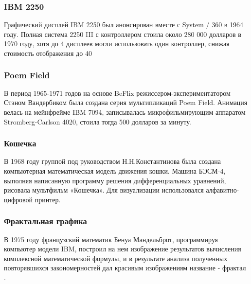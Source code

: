 \documentclass[10pt]{beamer}
\begin{document}
\begin{frame}\frametitle {IBM 2250}
{
	{
	}
	{
		Графический дисплей IBM 2250 был анонсирован вместе с System / 360 в 1964 году. Полная система 2250 III с контроллером стоила около 280 000 долларов в 1970 году, хотя до 4 дисплеев могли использовать один контроллер, снижая стоимость отображения до 40
	}
	
}\end{frame}


\begin{frame}\frametitle {Poem Field}
{
	{
	}
	{
		В период 1965-1971 годов на основе BeFlix режиссером-экспериментатором Стэном Вандербиком была создана серия мультипликаций Poem Field. Анимация велась на мейнфрейме IBM 7094, записывалась микрофильмирующим аппаратом Stromberg-Carlson 4020, стоила тогда 500 долларов за минуту.
		
		\hfill
		
	}
}\end{frame}

\begin{frame}\frametitle{Кошечка}{
	{
		В 1968 году группой под руководством Н.Н.Константинова была создана компьютерная математическая модель движения кошки. Машина БЭСМ-4, выполняя написанную программу решения дифференциальных уравнений, рисовала мультфильм «Кошечка». Для визуализации использовался алфавитно-цифровой принтер.
		

	}
	{
		
		\hfill 
		
	}
}\end{frame}

\begin{frame}\frametitle{Фрактальная графика}
{
	{
	}
	{
		В 1975 году французский математик Бенуа Мандельброт, программируя компьютер модели IBM, построил на нем изображение результатов вычисления комплексной математической формулы, и в результате анализа полученных повторявшихся закономерностей дал красивым изображениям название -  {фрактал} .
		
		\hfill 
		
	}
} \end{frame}
\end{document}
